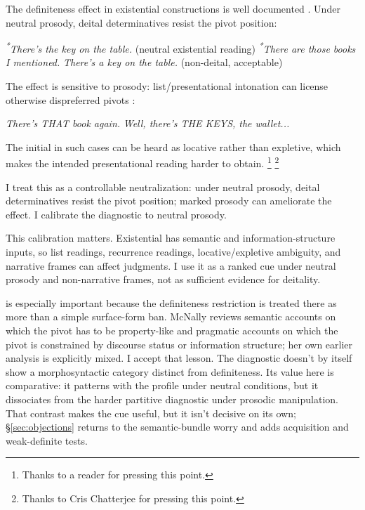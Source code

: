 \documentclass[12pt,letterpaper]{article}
\begin{document}
The definiteness effect in existential  constructions is well documented \parencite{milsark1977,McNally2011}. Under neutral prosody, deital determinatives resist the pivot position:

\ea 
\label{ex:there-neutral}
    \ea \textit{\textsuperscript{*}There's the key on the table.} (neutral existential reading)
    \ex \textit{\textsuperscript{*}There are those books I mentioned.}
    \ex \textit{There's a key on the table.} (non-deital, acceptable)
    \z
\z

\noindent The effect is sensitive to prosody: list/presentational intonation can license otherwise dispreferred pivots \parencite{BirnerWard1998}:

\ea 
\label{ex:there-list}
    \ea \textit{There's THAT book again.}
    \ex \textit{Well, there's THE KEYS, the wallet...}
    \z
\z

\noindent The initial  in such cases can be heard as locative rather than expletive, which makes the intended presentational reading harder to obtain.%
\ifdefined\blindsubmission
\footnote{Thanks to a reader for pressing this point.}
\else
\footnote{Thanks to Cris Chatterjee for pressing this point.}
\fi

I treat this as a controllable neutralization: under neutral prosody, deital determinatives resist the pivot position; marked prosody can ameliorate the effect. I calibrate the diagnostic to neutral prosody.

This calibration matters. Existential  has semantic and information-structure inputs, so list readings, recurrence readings, locative/expletive ambiguity, and narrative frames can affect judgments. I use it as a ranked cue under neutral prosody and non-narrative frames, not as sufficient evidence for deitality.

\textcite{McNally2011} is especially important because the definiteness restriction is treated there as more than a simple surface-form ban. McNally reviews semantic accounts on which the pivot has to be property-like and pragmatic accounts on which the pivot is constrained by discourse status or information structure; her own earlier analysis is explicitly mixed. I accept that lesson. The  diagnostic doesn't by itself show a morphosyntactic category distinct from definiteness. Its value here is comparative: it patterns with the profile under neutral conditions, but it dissociates from the harder partitive diagnostic under prosodic manipulation. That contrast makes the cue useful, but it isn't decisive on its own; §\ref{sec:objections} returns to the semantic-bundle worry and adds acquisition and weak-definite tests.
\end{document}
